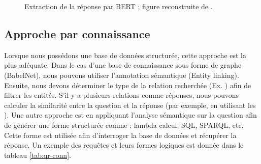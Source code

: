 \documentclass{KodeBook}
\begin{document}
\begin{figure}[!ht]
	\centering
	\caption[Extraction de la réponse par BERT.]{Extraction de la réponse par BERT ;  figure reconstruite de \cite{2019-jurafsky-martin}.}
	\label{fig:qr-ri-devlin}
\end{figure}

\subsection{Approche par connaissance}

Lorsque nous possédons une base de données structurée, cette approche est la plus adéquate. 
Dans le cas d'une base de connaissance sous forme de graphe (BabelNet), nous pouvons utiliser l'annotation sémantique (Entity linking). 
Ensuite, nous devons déterminer le type de la relation recherchée (Ex. ) afin de filtrer les entités.
S'il y a plusieurs relations comme réponses, nous pouvons calculer la similarité entre la question et la réponse (par exemple, en utilisant les ). 
Une autre approche est en appliquant l'analyse sémantique sur la question afin de générer une forme structurée comme : lambda calcul, SQL, SPARQL, etc.
Cette forme est utilisée afin d'interroger la base de données et récupérer la réponse.
Un exemple des requêtes et leurs formes logiques est donnée dans le tableau \ref{tab:qr-conn}.
\end{document}
